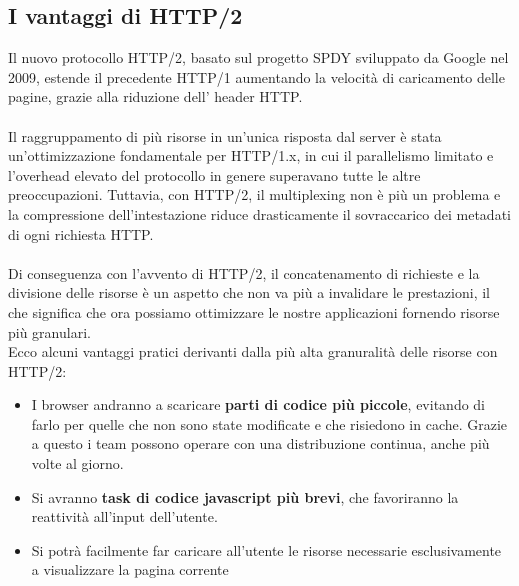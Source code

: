\subsection{I vantaggi di HTTP/2}
Il nuovo protocollo HTTP/2, basato sul progetto SPDY sviluppato da Google nel 2009, estende il precedente HTTP/1
aumentando la velocità di caricamento delle pagine, grazie alla riduzione dell' header HTTP.
\\\\
Il raggruppamento di più risorse in un'unica risposta dal server è stata un'ottimizzazione fondamentale per HTTP/1.x, in cui 
il parallelismo limitato e l'overhead elevato del protocollo in genere superavano tutte le altre preoccupazioni.
Tuttavia, con HTTP/2, il multiplexing non è più un problema e la compressione dell'intestazione 
riduce drasticamente il sovraccarico dei metadati di ogni richiesta HTTP.\cite{http2}
\\\\
Di conseguenza con l'avvento di HTTP/2, il concatenamento di richieste e la divisione delle risorse è un aspetto che non 
 va più a invalidare le prestazioni, il che significa che ora possiamo ottimizzare le nostre applicazioni fornendo risorse 
 più granulari.
 \\
 Ecco alcuni vantaggi pratici derivanti dalla più alta granuralità delle risorse con HTTP/2:

 \begin{itemize}
     \item I browser andranno a scaricare \textbf{parti di codice più piccole}, evitando di farlo per 
     quelle che non sono state modificate e che risiedono in cache. 
     Grazie a questo i team possono operare con una distribuzione continua, anche più volte al giorno.
     \item Si avranno \textbf{task di codice javascript più brevi}, che favoriranno la reattività all'input dell'utente.
     \item Si potrà facilmente far caricare all'utente le risorse necessarie esclusivamente
      a visualizzare la pagina corrente
 \end{itemize}

\pagebreak


